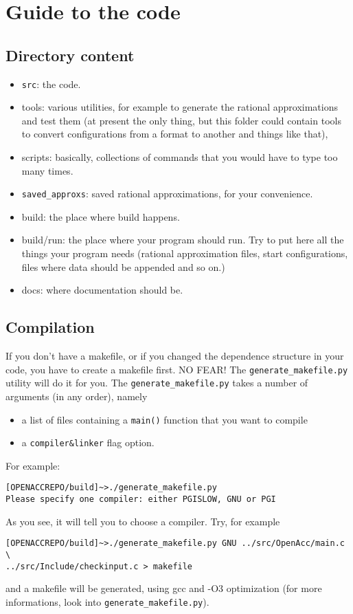 \chapter{Guide to the code}

\section{Directory content}

\begin{itemize}
    \item \texttt{src}: the code.
    \item tools: various utilities, for example to generate the rational
        approximations and test them (at present the only thing, but this
        folder could contain tools to convert configurations from a format to
        another and things like that), 
    \item scripts: basically, collections of commands that you would have to
        type too many times.
    \item \verb|saved_approxs|: saved rational approximations, for your 
        convenience. 
    \item build: the place where build happens. 
    \item build/run: the place where your program should run. Try to put here
        all the things your program needs (rational approximation files,
        start configurations, files where data should be appended and so on.)
    \item docs: where documentation should be.
\end{itemize}





\section{Compilation}
\label{compilation}
If you don't have a makefile, or if you changed the dependence
structure in your code, you have to create a makefile first. NO FEAR! The 
\verb|generate_makefile.py| utility will do it for you.
The \verb|generate_makefile.py| takes a number of arguments (in any order), 
namely 
\begin{itemize}
    \item a list of files containing a \verb|main()| function that you want to 
        compile
    \item a \verb|compiler&linker| flag option.
\end{itemize}
For example:
\begin{verbatim}
[OPENACCREPO/build]~>./generate_makefile.py
Please specify one compiler: either PGISLOW, GNU or PGI
\end{verbatim}
As you see, it will tell you to choose a compiler. Try, for example
\begin{verbatim}
[OPENACCREPO/build]~>./generate_makefile.py GNU ../src/OpenAcc/main.c \
../src/Include/checkinput.c > makefile
\end{verbatim}
and a makefile will be generated, using gcc and -O3 optimization
(for more informations, look into \verb|generate_makefile.py|). 


